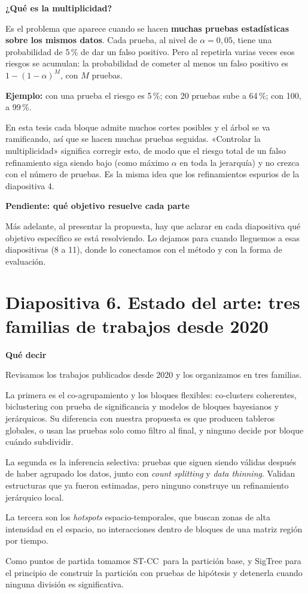 \documentclass[11pt,a4paper]{article}
\newcommand{\cajainicio}[3]{\par\medskip\noindent
  \begin{lrbox}{\cajabox}\begin{minipage}{\dimexpr\linewidth-2\fboxsep-2\fboxrule\relax}%
  \textbf{\color{#1}#3}\par\smallskip}
\newcommand{\cajafin}[2]{\end{minipage}\end{lrbox}\fcolorbox{#1}{#2}{\usebox{\cajabox}}\par\medskip}
\newenvironment{guion}{\cajainicio{ucspblue}{ucspblue!6}{Qué decir}}{\cajafin{ucspblue}{ucspblue!6}}
\newenvironment{nota}[1]{\cajainicio{acc}{acc!7}{#1}}{\cajafin{acc}{acc!7}}
\newcommand{\STCC}{ST-CC}
\begin{document}
\begin{nota}{¿Qué es la multiplicidad?}
Es el problema que aparece cuando se hacen \textbf{muchas pruebas estadísticas sobre los mismos datos}. Cada prueba, al nivel de $\alpha=0{,}05$, tiene una probabilidad de 5\,\% de dar un falso positivo. Pero al repetirla varias veces esos riesgos se acumulan: la probabilidad de cometer al menos un falso positivo es $1-(1-\alpha)^M$, con $M$ pruebas.

\textbf{Ejemplo:} con una prueba el riesgo es 5\,\%; con 20 pruebas sube a 64\,\%; con 100, a 99\,\%.

En esta tesis cada bloque admite muchos cortes posibles y el árbol se va ramificando, así que se hacen muchas pruebas seguidas. «Controlar la multiplicidad» significa corregir esto, de modo que el riesgo total de un falso refinamiento siga siendo bajo (como máximo $\alpha$ en toda la jerarquía) y no crezca con el número de pruebas. Es la misma idea que los refinamientos espurios de la diapositiva 4.
\end{nota}

\begin{nota}{Pendiente: qué objetivo resuelve cada parte}
Más adelante, al presentar la propuesta, hay que aclarar en cada diapositiva qué objetivo específico se está resolviendo. Lo dejamos para cuando lleguemos a esas diapositivas (8 a 11), donde lo conectamos con el método y con la forma de evaluación.
\end{nota}

\newpage
\section*{Diapositiva 6. Estado del arte: tres familias de trabajos desde 2020}

\begin{guion}
Revisamos los trabajos publicados desde 2020 y los organizamos en tres familias.

La primera es el co-agrupamiento y los bloques flexibles: co-clusters coherentes, biclustering con prueba de significancia y modelos de bloques bayesianos y jerárquicos. Su diferencia con nuestra propuesta es que producen tableros globales, o usan las pruebas solo como filtro al final, y ninguno decide por bloque cuándo subdividir.

La segunda es la inferencia selectiva: pruebas que siguen siendo válidas después de haber agrupado los datos, junto con \emph{count splitting} y \emph{data thinning}. Validan estructuras que ya fueron estimadas, pero ninguno construye un refinamiento jerárquico local.

La tercera son los \emph{hotspots} espacio-temporales, que buscan zonas de alta intensidad en el espacio, no interacciones dentro de bloques de una matriz región por tiempo.

Como puntos de partida tomamos \STCC\ para la partición base, y SigTree para el principio de construir la partición con pruebas de hipótesis y detenerla cuando ninguna división es significativa.
\end{guion}
\end{document}

